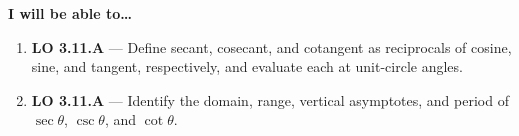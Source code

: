 \documentclass[10pt]{article}
\begin{document}
\namedateperiod

\vspace{0.10in}

\begin{objectivebox}
\textbf{I will be able to\ldots}
\begin{enumerate}[leftmargin=1.5em, itemsep=4pt]
  \item \textbf{LO 3.11.A} --- Define secant, cosecant, and cotangent as
    reciprocals of cosine, sine, and tangent, respectively, and evaluate
    each at unit-circle angles. \writeline
  \item \textbf{LO 3.11.A} --- Identify the domain, range, vertical asymptotes,
    and period of $\sec\theta$, $\csc\theta$, and $\cot\theta$. \writeline
\end{enumerate}
\end{objectivebox}

\vspace{0.08in}
\end{document}
